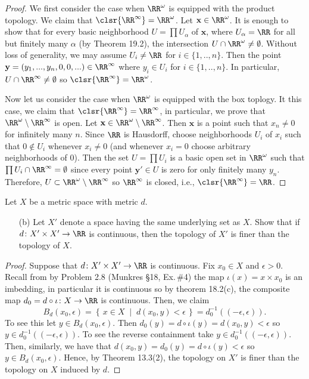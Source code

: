\begin{proof}
We first consider the case when $\RR^\omega$ is equipped with the
product topology. We claim that
$\clsr{\RR^\infty}=\RR^\omega$. Let $\mathbf{x}\in\RR^\omega$. It
is enough to show that for every basic neighborhood $U=\prod
U_\alpha$ of $\mathbf{x}$, where $U_\alpha=\RR$ for all but
finitely many $\alpha$ (by Theorem 19.2), the intersection
$U\cap\RR^\omega \neq\emptyset$. Without loss of generality, we
may assume $U_i\neq\RR$ for $i\in\{1,..,n\}$. Then the point
$\mathbf{y}=(y_1,...,y_n,0,0,...)\in \RR^\infty$ where
$y_i\in U_i$ for $i\in\{1,..,n\}$. In particular,
$U\cap\RR^\infty\neq\emptyset$ so
$\clsr{\RR^\infty}=\RR^\omega$.

Now let us consider the case when $\RR^\omega$ is equipped with
the box toplogy. It this case, we claim that
$\clsr{\RR^\infty}=\RR^\infty$, in particular, we prove that
$\RR^\omega\setminus\RR^\infty$ is open. Let
$\mathbf{x}\in\RR^\omega\setminus\RR^\infty$. Then $\mathbf{x}$
is a point such that $x_n\neq 0$ for infinitely
many $n$. Since $\RR$ is Hausdorff, choose neighborhoods
$U_i$ of $x_i$ such that $0\notin U_i$ whenever
$x_i\neq 0$ (and whenever $x_i=0$ choose arbitrary neighborhoods
of $0$). Then the set $U=\prod U_i$ is a basic open set in
$\RR^\omega$ such that $\prod U_i\cap\RR^\infty=\emptyset$ since
every point $\mathbf{y}'\in U$ is zero for only finitely
many $y_n$. Therefore, $U\subset\RR^\omega\setminus\RR^\infty$ so
$\RR^\infty$ is closed, i.e., $\clsr{\RR^\infty}=\RR$.
\end{proof}
\newpage
\begin{problem}[Munkres \S20, p.\,126, \#3(b)]
Let $X$ be a metric space with metric $d$.
\begin{enumerate}[noitemsep]
\item[(b)] Let $X'$ denote a space having the same underlying set
  as $X$. Show that if $d\colon X'\times X'\to\RR$ is continuous,
  then the topology of $X'$ is finer than the topology of $X$.
\end{enumerate}
\end{problem}
\begin{proof}
Suppose that $d\colon X'\times X'\to\RR$ is continuous. Fix
$x_0\in X$ and $\epsilon>0$. Recall from by Problem 2.8 (Munkres
\S18, Ex.\,\#4) the map $\iota(x)=x\times x_0$ is an imbedding,
in particular it is continuous so by theorem 18.2(c), the
composite map $d_0=d\circ\iota\colon X\to\RR$ is
continuous. Then, we claim
\[
B_d(x_0,\epsilon)=\left\{\,x\in
  X\;\middle|\;d(x_0,y)<\epsilon\,\right\}=d_0^{-1}((-\epsilon,\epsilon)).
\]
To see this let $y\in B_d(x_0,\epsilon)$. Then
$d_0(y)=d\circ\iota(y)=d(x_0,y)<\epsilon$ so $y\in
d_0^{-1}((-\epsilon,\epsilon))$. To see the reverse containment
take $y\in d_0^{-1}((-\epsilon,\epsilon))$. Then, similarly, we
have that $d(x_0,y)=d_0(y)=d\circ\iota(y)<\epsilon$ so $y\in
B_d(x_0,\epsilon)$. Hence, by Theorem 13.3(2), the topology on
$X'$ is finer than the topology on $X$ induced by $d$.
\end{proof}

